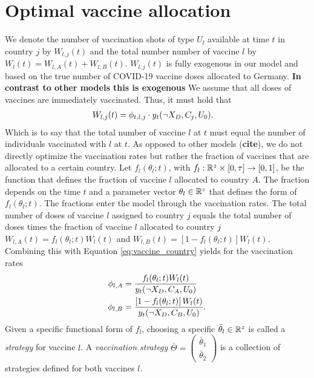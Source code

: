 \section{Optimal vaccine allocation}\label{sec:vaccine_allocation}
We denote the number of vaccination shots of type $U_l$ available at time $t$ in country $j$ by $W_{l,j}(t)$ and the total number number of vaccine $l$ by $W_l(t) = W_{l,A}(t) + W_{l,B}(t)$. $W_{l,j}(t)$ is fully exogenous in our model and based on the true number of COVID-19 vaccine doses allocated to Germany. \textbf{In contrast to other models this is exogenous}
We assume that all doses of vaccines are immediately vaccinated. Thus, it must hold that 
\begin{align}
\label{eq:vaccine_country}
W_{l,j}(t) &= \phi_{t, l, j} \cdot y_t(\neg X_D, C_j, U_0)  . 
\end{align}
Which is to say that the total number of vaccine $l$ at $t$ must equal the number of individuals vaccinated with $l$ at $t$. As opposed to other models (\textbf{cite}), we do not directly optimize the vaccination rates but rather the fraction of vaccines that are allocated to a certain country. Let $f_{l}(\theta_l; t)$, with $f_{l}: \mathbb{R}^{z} \times [0, \tau] \to [0,1]$, be the function that defines the fraction of vaccine $l$ allocated to country $A$. The fraction depends on the time $t$ and a parameter vector $\theta_l \in \mathbb{R}^{z}$ that defines the form of $f_{l}(\theta_l; t)$. The fractions enter the model through the vaccination rates. The total number of doses of vaccine $l$ assigned to country $j$ equals the total number of doses times the fraction of vaccine $l$ allocated to country $j$ $W_{l,A}(t) = f_{l}(\theta_l; t) W_l(t)$ and $W_{l,B}(t) = \left[1 - f_{l}(\theta_l; t)\right] W_l(t)$. Combining this with Equation \eqref{eq:vaccine_country} yields for the vaccination rates
\begin{align*}
\phi_{l,A} &= \frac{ f_{l}(\theta_l; t) W_{l}(t)}{y_t(\neg X_D, C_A, U_0) } \notag \\
\phi_{l,B} &= \frac{\left[1 - f_{l}(\theta_l; t)\right]  W_{l}(t)}{y_t(\neg X_D, C_B, U_0)}.
\end{align*}
Given a specific functional form of $f_{l}$, choosing a specific $\bar{\theta}_l \in  \mathbb{R}^z$ is called a \textit{strategy} for vaccine $l$. A \textit{vaccination strategy} $\bar \Theta = \begin{pmatrix}
\bar \theta_1 \\ \bar \theta_2
\end{pmatrix}$ is a collection of strategies defined for both vaccines $l$. 

